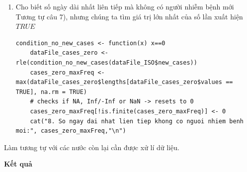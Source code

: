 \documentclass[a4paper]{article}
\theoremstyle{definition}
\begin{document}
\begin{enumerate}[1)]
\begin{lstlisting}[gobble=4]
    condition_no_new_cases <- function(x) x==0
    dataFile_cases_zero <- rle(condition_no_new_cases(dataFile_ISO$new_cases))
    cases_zero_minFreq <- min(dataFile_cases_zero$lengths[dataFile_cases_zero$values == TRUE], na.rm = TRUE)
    # checks if NA, Inf/-Inf or NaN -> resets to 0
    cases_zero_minFreq[!is.finite(cases_zero_minFreq)] <- 0
    cat("7. So ngay ngan nhat lien tiep khong co nguoi nhiem benh moi:", cases_zero_minFreq,"\n")
    \end{lstlisting}
    \item Cho biết số ngày dài nhất liên tiếp mà không có người nhiễm bệnh mới\\
    Tương tự câu 7), nhưng chúng ta tìm giá trị lớn nhất của số lần xuất hiện $TRUE$
    \begin{lstlisting}[gobble=4]
    condition_no_new_cases <- function(x) x==0
    dataFile_cases_zero <- rle(condition_no_new_cases(dataFile_ISO$new_cases))
    cases_zero_maxFreq <- max(dataFile_cases_zero$lengths[dataFile_cases_zero$values == TRUE], na.rm = TRUE)
    # checks if NA, Inf/-Inf or NaN -> resets to 0
    cases_zero_maxFreq[!is.finite(cases_zero_maxFreq)] <- 0
    cat("8. So ngay dai nhat lien tiep khong co nguoi nhiem benh moi:", cases_zero_maxFreq,"\n")
    \end{lstlisting}
\end{enumerate}
Làm tương tự với các nước còn lại cần được xử lí dữ liệu.

\textbf{Kết quả}
\end{document}

